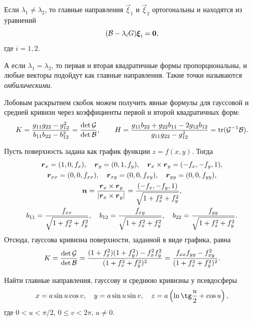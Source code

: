 Если $\lambda_1 \ne \lambda_2$, то главные направления $\vec{\xi}_1$ и $\vec{\xi}_2$ ортогональны и находятся из уравнений
\[
	(\mathcal{B} - \lambda_iG)\boldsymbol{\xi}_i = \boldsymbol{0},
\]
где $i = 1, 2$.

А если $\lambda_1 = \lambda_2$, то первая и вторая квадратичные формы пропорциональны, и любые векторы подойдут как главные направления. Такие точки называются \textit{омбилическими}.

Лобовым раскрытием скобок можем получить явные формулы для гауссовой и средней кривизн через коэффициенты первой и второй квадратичных форм:
\[
	K = \frac{g_{11}g_{22} - g_{12}^2}{b_{11}b_{22} - b_{12}^2} = \frac{\det\mathcal{G}}{\det\mathcal{B}},\qquad H = \frac{g_{11}b_{22} + g_{22}b_{11} - 2g_{12}b_{12}}{g_{11}g_{22} - g_{12}^2} = \operatorname{tr}(\mathcal{G}^{-1}\mathcal{B}).
\]

\begin{example} \label{example:KonPlotSurface}
	Пусть поверхность задана как график функции $z = f(x, y)$. Тогда
	\begin{gather*}
		\boldsymbol{r}_x = (1, 0, f_x),\quad \boldsymbol{r}_{y} = (0, 1, f_y),\quad \boldsymbol{r}_x \times \boldsymbol{r}_y = (-f_x, -f_y, 1),\\
		\boldsymbol{r}_{xx} = (0, 0, f_{xx}),\quad \boldsymbol{r}_{xy} = (0, 0, f_{xy}),\quad \boldsymbol{r}_{yy} = (0, 0, f_{yy}),\\
		\boldsymbol{n} = \frac{\boldsymbol{r}_x \times \boldsymbol{r}_y}{\left\lvert\boldsymbol{r}_x \times \boldsymbol{r}_y\right\rvert} = \frac{(-f_x, -f_y, 1)}{\sqrt{1 + f_x^2 + f_y^2}},\\
		b_{11} = \frac{f_{xx}}{\sqrt{1 + f_x^2 + f_y^2}},\quad b_{12} = \frac{f_{xy}}{\sqrt{1 + f_x^2 + f_y^2}},\quad b_{22} = \frac{f_{yy}}{\sqrt{1 + f_x^2 + f_y^2}}.
	\end{gather*}
	Отсюда, гауссова кривизна поверхности, заданной в виде графика, равна
	\[
		K = \frac{\det\mathcal{G}}{\det\mathcal{B}} = \frac{(1 + f_x^2)(1 + f_y^2) - f_x^2f_y^2}{(1 + f_x^2 + f_y^2)^2} = \frac{f_{xx}f_{yy} - f_{xy}^2}{(1 + f_x^2 + f_y^2)^2}.
	\]
\end{example}

\begin{problem} \label{problem:PseudosphereHK}
	Найти главные направления, гауссову и среднюю кривизны у псевдосферы
	\[
		x = a\sin u\cos v,\quad y = a\sin u\sin v,\quad z = a\br{\ln\tg\frac{u}{2} + \cos u},
	\]
	где $0 < u < \pi / 2$, $0 \leqslant v < 2\pi$, $a \ne 0$.
\end{problem}

